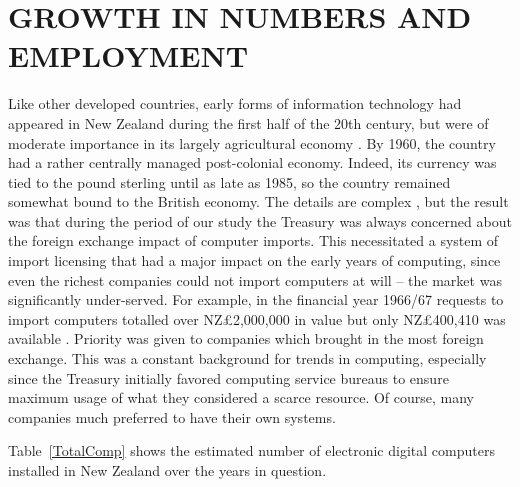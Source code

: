 \documentclass{IEEEcsmag}
\begin{document}
\section{GROWTH IN NUMBERS AND EMPLOYMENT}
Like other developed countries, early forms of information technology had appeared in New Zealand during the first half of the 20th century, but were of moderate importance in its largely agricultural economy \cite{pioneers}.
By 1960, the country had a rather centrally managed post-colonial economy. Indeed, its currency was tied to the pound sterling until as late as 1985, so the country remained somewhat bound to the British economy. The details are complex \cite{Sullivan2013}, but the result was that during the period of our study the Treasury was always concerned about the foreign exchange impact of computer imports. This necessitated a
\cbstart
system of import licensing that had a major impact on the early years of computing, since even the richest companies could not import computers at will -- the market was significantly under-served.
\cbend 
For example, in the financial year 1966/67 requests to import computers totalled over NZ£2,000,000 in value but only NZ£400,410 was available \cite{Treasury-1966}. Priority was given to companies which brought in the most foreign exchange. This was a constant background for trends in computing, especially since the Treasury initially favored computing service bureaus to ensure maximum usage of what they considered a scarce resource. Of course, many companies much preferred to have their own systems.

Table~\ref{TotalComp} shows the estimated number of electronic digital computers installed in New Zealand over the years in question.
\end{document}
